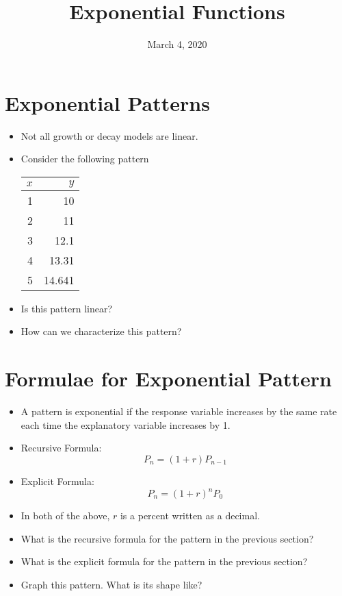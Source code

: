 \documentclass{article}
\title{Exponential Functions}
\date{March 4, 2020}
\begin{document}
\maketitle

\section{Exponential Patterns}
\begin{itemize} 
    \item Not all growth or decay models are linear.
    \item Consider the following pattern

	\begin{tabular}{|r|r|}
		\hline
		$x$ & $y$ \\
		\hline
		1 & 10\\
		2 & 11\\
		3 & 12.1\\
        4 & 13.31\\
        5 & 14.641\\
		\hline
	\end{tabular}

    \item Is this pattern linear?
    \item How can we characterize this pattern?
\end{itemize}

\section{Formulae for Exponential Pattern}
\begin{itemize}
    \item A pattern is exponential if the response variable increases
        by the same rate each time the explanatory variable increases
        by 1.
    \item Recursive Formula:
    \[
        P_n = (1+r)P_{n-1}
    \]
    \item Explicit Formula:
    \[
        P_n = (1+r)^nP_0
    \]
    \item In both of the above, $r$ is a percent written as a decimal.
    \item What is the recursive formula for the pattern in the
        previous section?
    \item What is the explicit formula for the pattern in the previous
        section?
    \item Graph this pattern.  What is its shape like?
\end{itemize}
\end{document}

